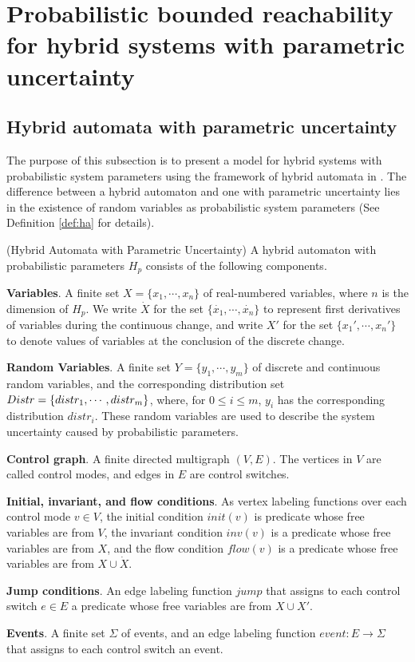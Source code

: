 \section{Probabilistic bounded reachability for hybrid systems with parametric uncertainty}

\subsection{Hybrid automata with parametric uncertainty}
The purpose of this subsection is to present a model for hybrid systems with probabilistic system parameters using the framework of hybrid automata in \cite{henzinger2000theory}. The difference between a hybrid automaton and one with parametric uncertainty lies in the existence of random variables as probabilistic system parameters (See Definition \ref{def:ha} for details).
\begin{definition}
\label{def:ha}
{\rm(Hybrid Automata with Parametric Uncertainty)} A hybrid automaton with probabilistic parameters $H_p$ consists of the following components.

{\bf Variables}. A finite set $X = \{ x_1, \cdots, x_n \}$ of real-numbered variables, where $n$ is the dimension of $H_p$. We write $\dot{X}$ for the set $\{\dot{x_1}, \cdots, \dot{x_n}\}$ to represent first derivatives of variables during the continuous change, and write $X'$ for the set $\{x_1', \cdots, x_n'\}$ to denote values of variables at the conclusion of the discrete change.

{\bf Random Variables}. A finite set $Y = \{ y_1, \cdots, y_m \}$ of discrete and continuous random variables, and the corresponding distribution set $Distr=\{distr_1, \cdots,\\ distr_m\}$, where, for $0 \le i \le m$, $y_i$ has the corresponding distribution $distr_i$. These random variables are used to describe the system uncertainty caused by probabilistic parameters.

{\bf Control graph}. A finite directed multigraph $(V,E)$. The vertices in $V$ are called control modes, and edges in $E$ are control switches.

{\bf Initial, invariant, and flow conditions}. As vertex labeling functions over each control mode $v \in V$, the initial condition $init(v)$ is predicate whose free variables are from $V$, the invariant condition $inv(v)$ is a predicate whose free variables are from $X$, and the flow condition $flow(v)$ is a predicate whose free variables are from $X \cup \dot{X}$.

{\bf Jump conditions}. An edge labeling function $jump$ that assigns to each control switch $e \in E$ a predicate whose free variables are from $X \cup X'$.

{\bf Events}. A finite set $\Sigma$ of events, and an edge labeling function $event: E \to \Sigma$ that assigns to each control switch an event. 
 
\end{definition}

